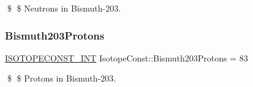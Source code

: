 \$ \$ Neutrons in Bismuth-\/203. \mbox{\label{group___isotope_const-_bismuth-_bi203_ga3221d271a5dee20424902a9cf239272d}} 
\subsubsection{\texorpdfstring{Bismuth203\+Protons}{Bismuth203Protons}}
{\footnotesize\ttfamily \mbox{\hyperlink{group___isotope_const-_macros_ga5f18360b3e99483a35c32d789e62621c}{I\+S\+O\+T\+O\+P\+E\+C\+O\+N\+S\+T\+\_\+\+I\+NT}} Isotope\+Const\+::\+Bismuth203\+Protons = 83}

\$ \$ Protons in Bismuth-\/203. 